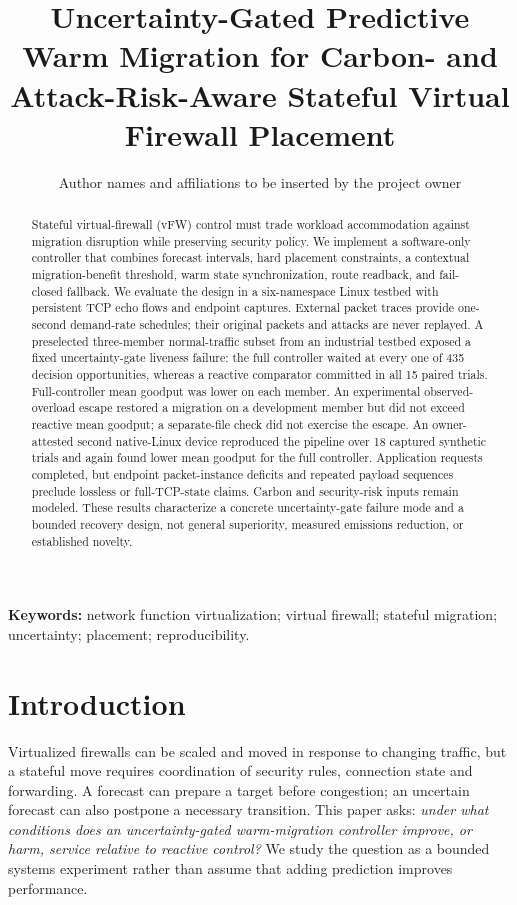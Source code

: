 \documentclass[11pt]{article}
\title{Uncertainty-Gated Predictive Warm Migration for Carbon- and Attack-Risk-Aware Stateful Virtual Firewall Placement}
\author{Author names and affiliations to be inserted by the project owner}
\date{}
\begin{document}
\maketitle

\begin{abstract}
Stateful virtual-firewall (vFW) control must trade workload accommodation against migration disruption while preserving security policy. We implement a software-only controller that combines forecast intervals, hard placement constraints, a contextual migration-benefit threshold, warm state synchronization, route readback, and fail-closed fallback. We evaluate the design in a six-namespace Linux testbed with persistent TCP echo flows and endpoint captures. External packet traces provide one-second demand-rate schedules; their original packets and attacks are never replayed. A preselected three-member normal-traffic subset from an industrial testbed exposed a fixed uncertainty-gate liveness failure: the full controller waited at every one of 435 decision opportunities, whereas a reactive comparator committed in all 15 paired trials. Full-controller mean goodput was lower on each member. An experimental observed-overload escape restored a migration on a development member but did not exceed reactive mean goodput; a separate-file check did not exercise the escape. An owner-attested second native-Linux device reproduced the pipeline over 18 captured synthetic trials and again found lower mean goodput for the full controller. Application requests completed, but endpoint packet-instance deficits and repeated payload sequences preclude lossless or full-TCP-state claims. Carbon and security-risk inputs remain modeled. These results characterize a concrete uncertainty-gate failure mode and a bounded recovery design, not general superiority, measured emissions reduction, or established novelty.
\end{abstract}

\noindent\textbf{Keywords:} network function virtualization; virtual firewall; stateful migration; uncertainty; placement; reproducibility.

\section{Introduction}
Virtualized firewalls can be scaled and moved in response to changing traffic, but a stateful move requires coordination of security rules, connection state and forwarding. A forecast can prepare a target before congestion; an uncertain forecast can also postpone a necessary transition. This paper asks: \emph{under what conditions does an uncertainty-gated warm-migration controller improve, or harm, service relative to reactive control?} We study the question as a bounded systems experiment rather than assume that adding prediction improves performance.
\end{document}
